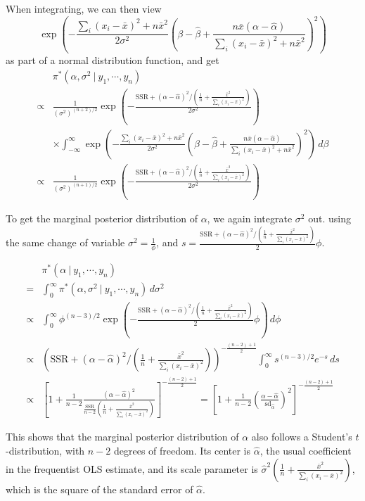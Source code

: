 \documentclass[]{book}
\theoremstyle{definition}
\theoremstyle{definition}
\theoremstyle{definition}
\theoremstyle{remark}
\begin{document}
When integrating, we can then view
\[ \exp\left(-\frac{\sum_i (x_i-\bar{x})^2+n\bar{x}^2}{2\sigma^2}\left(\beta-\hat{\beta}+\frac{n\bar{x}(\alpha-\hat{\alpha})}{\sum_i (x_i-\bar{x})^2+n\bar{x}^2}\right)^2\right) \]
as part of a normal distribution function, and get \[
\begin{aligned}
& \pi^*(\alpha, \sigma^2~|~y_1,\cdots,y_n) \\
\propto & \frac{1}{(\sigma^2)^{(n+2)/2}}\exp\left(-\frac{\text{SSR}+(\alpha-\hat{\alpha})^2/(\frac{1}{n}+\frac{\bar{x}^2}{\sum_i (x_i-\bar{x})^2})}{2\sigma^2}\right)\\
& \times\int_{-\infty}^\infty \exp\left(-\frac{\sum_i (x_i-\bar{x})^2+n\bar{x}^2}{2\sigma^2}\left(\beta-\hat{\beta}+\frac{n\bar{x}(\alpha-\hat{\alpha})}{\sum_i (x_i-\bar{x})^2+n\bar{x}^2}\right)^2\right)\, d\beta \\
\propto & \frac{1}{(\sigma^2)^{(n+1)/2}}\exp\left(-\frac{\text{SSR}+(\alpha-\hat{\alpha})^2/(\frac{1}{n}+\frac{\bar{x}^2}{\sum_i (x_i-\bar{x})^2})}{2\sigma^2}\right)
\end{aligned}
\]

To get the marginal posterior distribution of \(\alpha\), we again
integrate \(\sigma^2\) out. using the same change of variable
\(\displaystyle \sigma^2=\frac{1}{\phi}\), and
\(s=\displaystyle \frac{\text{SSR}+(\alpha-\hat{\alpha})^2/(\frac{1}{n}+\frac{\bar{x}^2}{\sum_i (x_i-\bar{x})^2})}{2}\phi\).

\[
\begin{aligned}
& \pi^*(\alpha~|~y_1,\cdots,y_n) \\
= & \int_0^\infty \pi^*(\alpha, \sigma^2~|~y_1,\cdots, y_n)\, d\sigma^2 \\
\propto & \int_0^\infty \phi^{(n-3)/2}\exp\left(-\frac{\text{SSR}+(\alpha-\hat{\alpha})^2/(\frac{1}{n}+\frac{\bar{x}^2}{\sum_i (x_i-\bar{x})^2})}{2}\phi\right)\, d\phi\\
\propto & \left(\text{SSR}+(\alpha-\hat{\alpha})^2/(\frac{1}{n}+\frac{\bar{x}^2}{\sum_i (x_i-\bar{x})^2})\right)^{-\frac{(n-2)+1}{2}}\int_0^\infty s^{(n-3)/2}e^{-s}\, ds\\
\propto & \left[1+\frac{1}{n-2}\frac{(\alpha-\hat{\alpha})^2}{\frac{\text{SSR}}{n-2}\left(\frac{1}{n}+\frac{\bar{x}^2}{\sum_i (x_i-\bar{x})^2}\right)}\right]^{-\frac{(n-2)+1}{2}} = \left[1 + \frac{1}{n-2}\left(\frac{\alpha-\hat{\alpha}}{\text{sd}_{\hat{\alpha}}}\right)^2\right]^{-\frac{(n-2)+1}{2}}
\end{aligned}
\]

This shows that the marginal posterior distribution of \(\alpha\) also
follows a Student's \(t\)-distribution, with \(n-2\) degrees of freedom.
Its center is \(\hat{\alpha}\), the usual coefficient in the frequentist
OLS estimate, and its scale parameter is
\(\displaystyle \hat{\sigma}^2\left(\frac{1}{n}+\frac{\bar{x}^2}{\sum_i (x_i-\bar{x})^2}\right)\),
which is the square of the standard error of \(\hat{\alpha}\).
\end{document}
